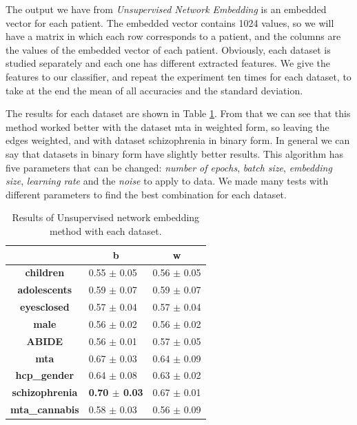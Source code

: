 The output we have from \textit{Unsupervised Network Embedding} is an embedded vector for each patient. The embedded vector contains 1024 values, so we will have a matrix in which each row corresponds to a patient, and the columns are the values of the embedded vector of each patient. Obviously, each dataset is studied separately and each one has different extracted features. We give the features to our classifier, and repeat the experiment ten times for each dataset, to take at the end the mean of all accuracies and the standard deviation.
\vspace{0.5cm}

The results for each dataset are shown in Table \ref{tab:embs}. From that we can see that this method worked better with the dataset mta in weighted form, so leaving the edges weighted, and with dataset schizophrenia in binary form. In general we can say that datasets in binary form have slightly better results. This algorithm has five parameters that can be changed: \textit{number of epochs}, \textit{batch size}, \textit{embedding size}, \textit{learning rate} and the \textit{noise} to apply to data. We made many tests with different parameters to find the best combination for each dataset.
\vspace{0.5cm}

\begin{table}
	\centering
	\begin{tabular}{c|l|c} 
		\toprule
		& \multicolumn{1}{c|}{b} & w                \\ 
		\midrule
		\textbf{children}      & 0.55 $\pm$ 0.05        & 0.56 $\pm$ 0.05  \\
		\textbf{adolescents}   & 0.59 $\pm$ 0.07        & 0.59 $\pm$ 0.07  \\
		\textbf{eyesclosed}    & 0.57 $\pm$ 0.04        & 0.57 $\pm$ 0.04  \\
		\textbf{male}          & 0.56 $\pm$ 0.02        & 0.56 $\pm$ 0.02  \\
		\textbf{ABIDE}         & 0.56 $\pm$ 0.01        & 0.57 $\pm$ 0.05  \\
		\textbf{mta}           & 0.67 $\pm$ 0.03        & 0.64 $\pm$ 0.09  \\
		\textbf{hcp\_gender}   & 0.64 $\pm$ 0.08        & 0.63 $\pm$ 0.02  \\
		\textbf{schizophrenia} & \textbf{0.70 $\pm$ 0.03}        & 0.67 $\pm$ 0.01  \\
		\textbf{mta\_cannabis} & 0.58 $\pm$ 0.03        & 0.56 $\pm$ 0.09 
	\end{tabular}
	\caption{Results of Unsupervised network embedding method with each dataset.}
	\label{tab:embs}
\end{table}

